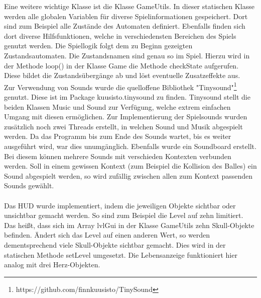 Eine weitere wichtige Klasse ist die Klasse GameUtils. In dieser statischen Klasse werden alle globalen Variablen für diverse Spielinformationen gespeichert. Dort sind zum Beispiel alle Zustände des Automaten definiert. Ebenfalls finden sich dort diverse Hilfsfunktionen, welche in verschiedensten Bereichen des Spiels genutzt werden. Die Spiellogik folgt dem zu Beginn gezeigten Zustandsautomaten. Die Zustandsnamen sind genau so im Spiel. Hierzu wird in der Methode loop() in der Klasse Game die Methode checkState aufgerufen. Diese bildet die Zustandsübergänge ab und löst eventuelle Zusatzeffekte aus.\\
Zur Verwendung von Sounds wurde die quelloffene Bibliothek "Tinysound"\footnote{https://github.com/finnkuusisto/TinySound} genutzt. Diese ist im Package kuusisto.tinysound zu finden. Tinysound stellt die beiden Klassen Music und Sound zur Verfügung, welche extrem einfachen Umgang mit diesen ermöglichen. Zur Implementierung der Spielsounds wurden zusätzlich noch zwei Threads erstellt, in welchen Sound und Musik abgespielt werden. Da das Programm bis zum Ende des Sounds wartet, bis es weiter ausgeführt wird, war dies unumgänglich. Ebenfalls wurde ein Soundboard erstellt. Bei diesem können mehrere Sounds mit verschieden Kontexten verbunden werden. Soll in einem gewissen Kontext (zum Beispiel die Kollision des Balles) ein Sound abgespielt werden, so wird zufällig zwischen allen zum Kontext passenden Sounds gewählt.\\\\
Das HUD wurde implementiert, indem die jeweiligen Objekte sichtbar oder unsichtbar gemacht werden. So sind zum Beispiel die Level auf zehn limitiert. Das heißt, dass sich im Array lvlGui in der Klasse GameUtils zehn Skull-Objekte befinden. Ändert sich das Level auf einen anderen Wert, so werden dementsprechend viele Skull-Objekte sichtbar gemacht. Dies wird in der statischen Methode setLevel umgesetzt. Die Lebensanzeige funktioniert hier analog mit drei Herz-Objekten.